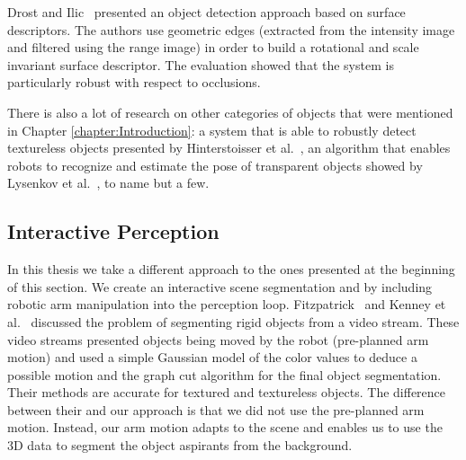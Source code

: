 Drost and Ilic~\cite{drost20123d} presented an object detection approach based on surface descriptors. The authors use geometric edges (extracted from the intensity image and filtered using the range image) in order to build a rotational and scale invariant surface descriptor. The evaluation showed that the system is particularly robust with respect to occlusions.  

There is also a lot of research on other categories of objects that were mentioned in Chapter \ref{chapter:Introduction}: a system that is able to robustly detect textureless objects presented by Hinterstoisser et al.~\cite{hinterstoisser2011multimodal}, an algorithm that enables robots to recognize and estimate the pose of transparent objects showed by Lysenkov et al.~\cite{lysenkov2012recognition}, to name but a few. 

















\subsection{Interactive Perception}



In this thesis we take a different approach to the ones presented at the beginning of this section. We create an interactive scene segmentation and by including robotic arm manipulation into the perception loop. Fitzpatrick~\cite{fitzpatrick_active_vision} and Kenney et al.~\cite{KenneyInteractive} discussed the problem of segmenting rigid objects from a video stream. These video streams presented objects being moved by the robot (pre-planned arm motion) and used a simple Gaussian model of the color values to deduce a possible motion and the graph cut algorithm for the final object segmentation. Their methods are accurate for textured and textureless objects. The difference between their and our approach is that we did not use the pre-planned arm motion. Instead, our arm motion adapts to the scene and enables us to use the 3D data to segment the object aspirants from the background.

